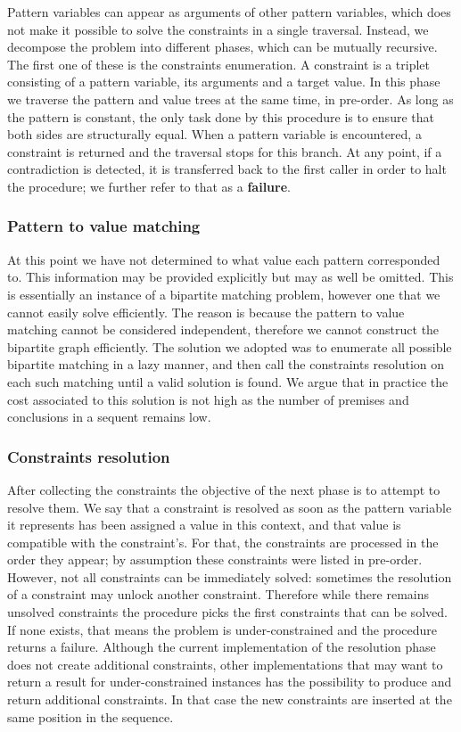 Pattern variables can appear as arguments of other pattern variables, which does not make it possible to solve the constraints in a single traversal. Instead, we decompose the problem into different phases, which can be mutually recursive. The first one of these is the constraints enumeration. A constraint is a triplet consisting of a pattern variable, its arguments and a target value. In this phase we traverse the pattern and value trees at the same time, in pre-order. As long as the pattern is constant, the only task done by this procedure is to ensure that both sides are structurally equal. When a pattern variable is encountered, a constraint is returned and the traversal stops for this branch. At any point, if a contradiction is detected, it is transferred back to the first caller in order to halt the procedure; we further refer to that as a \textbf{failure}.

\subsubsection{Pattern to value matching}

At this point we have not determined to what value each pattern corresponded to. This information may be provided explicitly but may as well be omitted. This is essentially an instance of a bipartite matching problem, however one that we cannot easily solve efficiently. The reason is because the pattern to value matching cannot be considered independent, therefore we cannot construct the bipartite graph efficiently. The solution we adopted was to enumerate all possible bipartite matching in a lazy manner, and then call the constraints resolution on each such matching until a valid solution is found. We argue that in practice the cost associated to this solution is not high as the number of premises and conclusions in a sequent remains low.

\subsubsection{Constraints resolution}

After collecting the constraints the objective of the next phase is to attempt to resolve them. We say that a constraint is resolved as soon as the pattern variable it represents has been assigned a value in this context, and that value is compatible with the constraint's. For that, the constraints are processed in the order they appear; by assumption these constraints were listed in pre-order. However, not all constraints can be immediately solved: sometimes the resolution of a constraint may unlock another constraint. Therefore while there remains unsolved constraints the procedure picks the first constraints that can be solved. If none exists, that means the problem is under-constrained and the procedure returns a failure. Although the current implementation of the resolution phase does not create additional constraints, other implementations that may want to return a result for under-constrained instances has the possibility to produce and return additional constraints. In that case the new constraints are inserted at the same position in the sequence.

